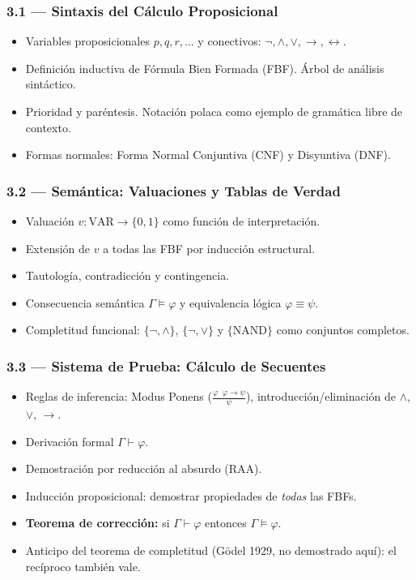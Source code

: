 \documentclass[11pt, letterpaper]{article}
\begin{document}
\subsubsection{3.1 — Sintaxis del Cálculo Proposicional}
\begin{itemize}
  \item Variables proposicionales $p, q, r, \ldots$ y conectivos: $\neg, \land, \lor, \to, \leftrightarrow$.
  \item Definición inductiva de Fórmula Bien Formada (FBF). Árbol de análisis sintáctico.
  \item Prioridad y paréntesis. Notación polaca como ejemplo de gramática libre de contexto.
  \item Formas normales: Forma Normal Conjuntiva (CNF) y Disyuntiva (DNF).
\end{itemize}

\subsubsection{3.2 — Semántica: Valuaciones y Tablas de Verdad}
\begin{itemize}
  \item Valuación $v: \text{VAR}\to\{0,1\}$ como función de interpretación.
  \item Extensión de $v$ a todas las FBF por inducción estructural.
  \item Tautología, contradicción y contingencia.
  \item Consecuencia semántica $\Gamma\models\varphi$ y equivalencia lógica $\varphi\equiv\psi$.
  \item Completitud funcional: $\{\neg,\land\}$, $\{\neg,\lor\}$ y $\{\text{NAND}\}$ como conjuntos completos.
\end{itemize}

\subsubsection{3.3 — Sistema de Prueba: Cálculo de Secuentes}
\begin{itemize}
  \item Reglas de inferencia: Modus Ponens ($\frac{\varphi\;\;\varphi\to\psi}{\psi}$), introducción/eliminación de $\land$, $\lor$, $\to$.
  \item Derivación formal $\Gamma\vdash\varphi$.
  \item Demostración por reducción al absurdo (RAA).
  \item Inducción proposicional: demostrar propiedades de \emph{todas} las FBFs.
  \item \textbf{Teorema de corrección:} si $\Gamma\vdash\varphi$ entonces $\Gamma\models\varphi$.
  \item Anticipo del teorema de completitud (Gödel 1929, no demostrado aquí): el recíproco también vale.
\end{itemize}
\end{document}
